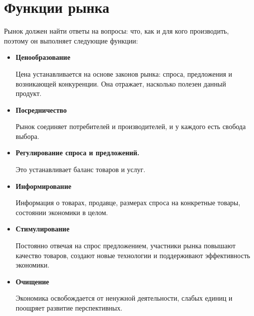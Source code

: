 \section{Функции рынка}
Рынок должен найти ответы на вопросы: что, как и для кого производить, поэтому он выполняет следующие функции:
\begin{itemize}
	\item \textbf{Ценообразование} 
	
	Цена устанавливается на основе законов рынка: спроса, предложения и возникающей конкуренции. Она отражает, насколько полезен данный продукт.
	\item \textbf{Посредничество} 
	
	Рынок соединяет потребителей и производителей, и у каждого есть свобода выбора.
	\item \textbf{Регулирование спроса и предложений. }
	
	Это устанавливает баланс товаров и услуг.
	\item \textbf{Информирование}
	
	Информация о товарах, продавце, размерах спроса на конкретные товары, состоянии экономики в целом.
	\item \textbf{Стимулирование} 
	
	Постоянно отвечая на спрос предложением, участники рынка повышают качество товаров, создают новые технологии и поддерживают эффективность экономики.
	\item \textbf{Очищение} 
	
	Экономика освобождается от ненужной деятельности, слабых единиц и поощряет развитие перспективных.
\end{itemize}
